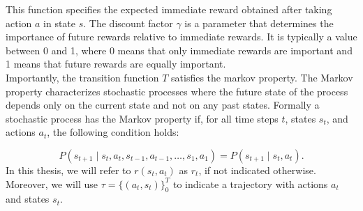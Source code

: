This function specifies the expected immediate reward obtained after taking action $a$ in state $s$. The discount factor $\gamma$ is a 
parameter that determines the importance of future rewards relative to immediate rewards. It is typically a value between 0 and 1, where 0 means that 
only immediate rewards are important and 1 means that future rewards are equally important. \\

Importantly, the transition function $T$ satisfies the markov property. The Markov property characterizes stochastic processes where the future state of the 
process depends only on the current state and not on any past states. Formally a stochastic process has the Markov property if, 
for all time steps $t$, states $s_t$, and actions $a_t$, the following condition holds:

\begin{equation*}
    P(s_{t+1} \mid s_t, a_t, s_{t-1}, a_{t-1}, \ldots, s_1, a_1) = P(s_{t+1} \mid s_t, a_t).
\end{equation*}
In this thesis, we will refer to $r(s_t, a_t)$ as $r_t$, if not indicated otherwise. Moreover, we will use $\tau = \{(a_t, s_t)\}_0^T$ to 
indicate a trajectory with actions $a_t$ and states $s_t$.

